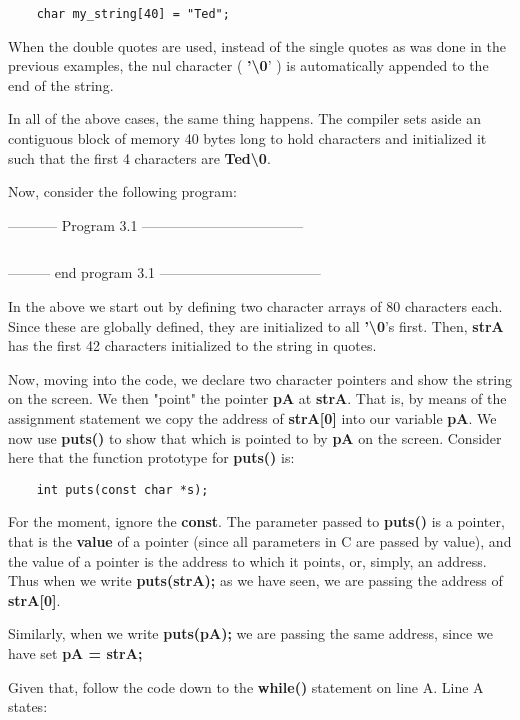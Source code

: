 \begin{verbatim}
    char my_string[40] = "Ted";
\end{verbatim}

When the double quotes are used, instead of the single quotes as was
done in the previous examples, the nul character (
\textbf{'\textbackslash0}' ) is automatically appended to the end of the
string.

In all of the above cases, the same thing happens. The compiler sets
aside an contiguous block of memory 40 bytes long to hold characters and
initialized it such that the first 4 characters are
\textbf{Ted\textbackslash0}.

Now, consider the following program:

-----------  Program 3.1  -----------------------------------
\inputminted{c}{../src/ch3-1.c}
--------- end program 3.1 -----------------------------------


In the above we start out by defining two character arrays of 80
characters each. Since these are globally defined, they are initialized
to all \textbf{'\textbackslash0}'s first. Then, \textbf{strA} has the
first 42 characters initialized to the string in quotes.

Now, moving into the code, we declare two character pointers and show
the string on the screen. We then "point" the pointer \textbf{pA} at
\textbf{strA}. That is, by means of the assignment statement we copy the
address of \textbf{strA{[}0{]}} into our variable \textbf{pA}. We now
use \textbf{puts()} to show that which is pointed to by \textbf{pA} on
the screen. Consider here that the function prototype for
\textbf{puts()} is:

\begin{verbatim}
    int puts(const char *s); 
\end{verbatim}

For the moment, ignore the \textbf{const}. The parameter passed to
\textbf{puts()} is a pointer, that is the \textbf{value} of a pointer
(since all parameters in C are passed by value), and the value of a
pointer is the address to which it points, or, simply, an address. Thus
when we write \textbf{puts(strA);} as we have seen, we are passing the
address of \textbf{strA{[}0{]}}.

Similarly, when we write \textbf{puts(pA);} we are passing the same
address, since we have set \textbf{pA = strA;}

Given that, follow the code down to the \textbf{while()} statement on
line A. Line A states:

